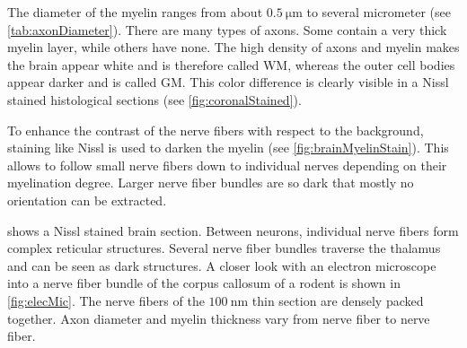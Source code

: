 The diameter of the myelin ranges from about $\SI{0.5}{\micro\meter}$ to several micrometer (see \cref{tab:axonDiameter}).
There are many types of axons.
Some contain a very thick myelin layer, while others have none.
The high density of axons and myelin makes the brain appear white and is therefore called \ac{WM}, whereas the outer cell bodies appear darker and is called \ac{GM}.
This color difference is clearly visible in a Nissl stained histological sections (see \cref{fig:coronalStained}).
\par
%
To enhance the contrast of the nerve fibers with respect to the background, staining like Nissl is used to darken the myelin (see \cref{fig:brainMyelinStain}).
This allows to follow small nerve fibers down to individual nerves depending on their myelination degree.
Larger nerve fiber bundles are so dark that mostly no orientation can be extracted.
\par
% 
 shows a Nissl stained brain section.
Between neurons, individual nerve fibers form complex reticular structures.
Several nerve fiber bundles traverse the thalamus and can be seen as dark structures.
A closer look with an electron microscope into a nerve fiber bundle of the corpus callosum of a rodent is shown in \cref{fig:elecMic}.
The nerve fibers of the $\SI{100}{\nano\meter}$ thin section are densely packed together.
Axon diameter and myelin thickness vary from nerve fiber to nerve fiber.
% 
